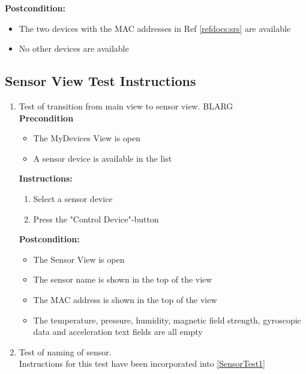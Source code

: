 \documentclass[a4paper]{article}
\newlength{\testlabellength}
\newenvironment{testlist}{\begin{enumerate}[label=\bfseries Instruction \thesubsection.\arabic* , labelindent=0pt, labelwidth=\testlabellength , leftmargin=2cm]}{\end{enumerate}}
\newenvironment{precondition}{
{\color{white}BLARG}\\ 
\textbf{Precondition}
\begin{itemize}[labelindent=0cm, labelwidth=2cm , leftmargin=1cm]
}
{\end{itemize}}
\newenvironment{instruction}{
\textbf{Instructions:}
\begin{enumerate}[label=\bfseries  \arabic*., labelindent=0cm, labelwidth=2cm , leftmargin=1cm]
}
{\end{enumerate}}
\newenvironment{postcondition}{
\textbf{Postcondition:}
\begin{itemize}[labelindent=0cm, labelwidth=2cm , leftmargin=1cm]
}
{\end{itemize}}
\begin{document}
\begin{appendices}
\begin{testlist}
		\begin{postcondition}
			\item The two devices with the MAC addresses in Ref \ref{refdocs:srs} are available
			\item No other devices are available
		\end{postcondition}
    
\end{testlist}

\newpage
\subsection{Sensor View Test Instructions}
\begin{testlist}
	\item Test of transition from main view to sensor view. \label{SensorTest1}
 		\begin{precondition}
 			\item The MyDevices View is open
 			\item A sensor device is available in the list
 		\end{precondition}
 		\begin{instruction}
 			\item Select a sensor device
 			\item Press the "Control Device"-button
 		\end{instruction}
 		\begin{postcondition}
 			\item The Sensor View is open
 			\item The sensor name is shown in the top of the view
 			\item The MAC address is shown in the top of the view
 			\item The temperature, pressure, humidity, magnetic field strength, gyroscopic data and acceleration text fields are all empty
 		\end{postcondition}


	\item Test of naming of sensor. \\
		Instructions for this test have been incorporated into \ref{SensorTest1}
		

\end{testlist}
\end{appendices}
\end{document}
